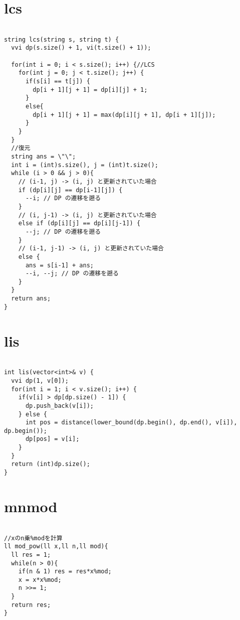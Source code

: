 \documentclass[a4j,titlepage]{jarticle} %
\begin{document}
\color{white}
\section{lcs}
\color{black}
\begin{lstlisting}[caption=lcs]

string lcs(string s, string t) {
  vvi dp(s.size() + 1, vi(t.size() + 1));
  
  for(int i = 0; i < s.size(); i++) {//LCS
    for(int j = 0; j < t.size(); j++) {
      if(s[i] == t[j]) {
        dp[i + 1][j + 1] = dp[i][j] + 1;
      }
      else{
        dp[i + 1][j + 1] = max(dp[i][j + 1], dp[i + 1][j]);
      }
    }
  }
  //復元
  string ans = \"\";
  int i = (int)s.size(), j = (int)t.size();
  while (i > 0 && j > 0){
    // (i-1, j) -> (i, j) と更新されていた場合
    if (dp[i][j] == dp[i-1][j]) {
      --i; // DP の遷移を遡る
    }
    // (i, j-1) -> (i, j) と更新されていた場合
    else if (dp[i][j] == dp[i][j-1]) {
      --j; // DP の遷移を遡る
    }
    // (i-1, j-1) -> (i, j) と更新されていた場合
    else {
      ans = s[i-1] + ans;
      --i, --j; // DP の遷移を遡る
    }
  }
  return ans;
}

\end{lstlisting}

\color{white}
\section{lis}
\color{black}
\begin{lstlisting}[caption=lis]

int lis(vector<int>& v) {
  vvi dp(1, v[0]);
  for(int i = 1; i < v.size(); i++) {
    if(v[i] > dp[dp.size() - 1]) {
      dp.push_back(v[i]);
    } else {
      int pos = distance(lower_bound(dp.begin(), dp.end(), v[i]), dp.begin());
      dp[pos] = v[i];
    }
  }
  return (int)dp.size();
}

\end{lstlisting}

\color{white}
\section{mnmod}
\color{black}
\begin{lstlisting}[caption=mnmod]

//xのn乗%modを計算
ll mod_pow(ll x,ll n,ll mod){
  ll res = 1;
  while(n > 0){
    if(n & 1) res = res*x%mod;
    x = x*x%mod;
    n >>= 1;
  }
  return res;
}

\end{lstlisting}
\end{document}
